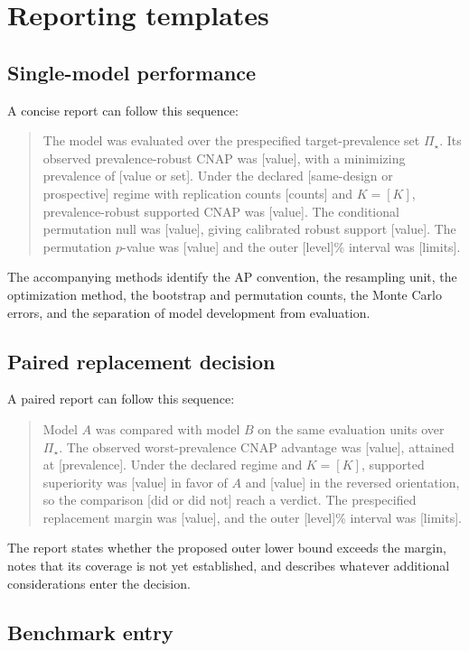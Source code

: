 \documentclass[11pt]{article}
\newcommand{\PSet}{\Pi_\star}
\theoremstyle{remark}
\begin{document}
\section{Reporting templates}
\label{app:report-template}

\subsection{Single-model performance}

A concise report can follow this sequence:
\begin{quote}
The model was evaluated over the prespecified target-prevalence set $\PSet$. Its observed prevalence-robust CNAP was [value], with a minimizing prevalence of [value or set]. Under the declared [same-design or prospective] regime with replication counts [counts] and $K=[K]$, prevalence-robust supported CNAP was [value]. The conditional permutation null was [value], giving calibrated robust support [value]. The permutation $p$-value was [value] and the outer [level]\% interval was [limits].
\end{quote}
The accompanying methods identify the AP convention, the resampling unit, the optimization method, the bootstrap and permutation counts, the Monte Carlo errors, and the separation of model development from evaluation.

\subsection{Paired replacement decision}

A paired report can follow this sequence:
\begin{quote}
Model $A$ was compared with model $B$ on the same evaluation units over $\PSet$. The observed worst-prevalence CNAP advantage was [value], attained at [prevalence]. Under the declared regime and $K=[K]$, supported superiority was [value] in favor of $A$ and [value] in the reversed orientation, so the comparison [did or did not] reach a verdict. The prespecified replacement margin was [value], and the outer [level]\% interval was [limits].
\end{quote}
The report states whether the proposed outer lower bound exceeds the margin, notes that its coverage is not yet established, and describes whatever additional considerations enter the decision.

\subsection{Benchmark entry}
\end{document}
